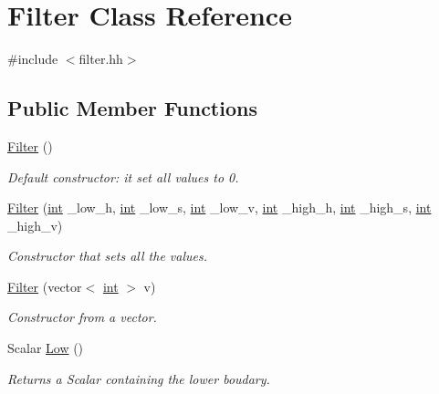 \hypertarget{class_filter}{}\section{Filter Class Reference}
\label{class_filter}


{\ttfamily \#include $<$filter.\+hh$>$}

\subsection*{Public Member Functions}
\begin{DoxyCompactItemize}
\item 
\mbox{\hyperlink{class_filter_ad15994c30d497afd567a6445446a249e}{Filter}} ()
\begin{DoxyCompactList}\small\item\em Default constructor\+: it set all values to 0. \end{DoxyCompactList}\item 
\mbox{\hyperlink{class_filter_a75b792236ffdb9590eb762e2a82802a5}{Filter}} (\mbox{\hyperlink{draw_8hh_aa620a13339ac3a1177c86edc549fda9b}{int}} \+\_\+low\+\_\+h, \mbox{\hyperlink{draw_8hh_aa620a13339ac3a1177c86edc549fda9b}{int}} \+\_\+low\+\_\+s, \mbox{\hyperlink{draw_8hh_aa620a13339ac3a1177c86edc549fda9b}{int}} \+\_\+low\+\_\+v, \mbox{\hyperlink{draw_8hh_aa620a13339ac3a1177c86edc549fda9b}{int}} \+\_\+high\+\_\+h, \mbox{\hyperlink{draw_8hh_aa620a13339ac3a1177c86edc549fda9b}{int}} \+\_\+high\+\_\+s, \mbox{\hyperlink{draw_8hh_aa620a13339ac3a1177c86edc549fda9b}{int}} \+\_\+high\+\_\+v)
\begin{DoxyCompactList}\small\item\em Constructor that sets all the values. \end{DoxyCompactList}\item 
\mbox{\hyperlink{class_filter_ae452f351813a2fdb9a32c78e11865447}{Filter}} (vector$<$ \mbox{\hyperlink{draw_8hh_aa620a13339ac3a1177c86edc549fda9b}{int}} $>$ v)
\begin{DoxyCompactList}\small\item\em Constructor from a vector. \end{DoxyCompactList}\item 
Scalar \mbox{\hyperlink{class_filter_a7b43f7cd0af1647ae9106af1ec159f63}{Low}} ()
\begin{DoxyCompactList}\small\item\em Returns a Scalar containing the lower boudary. \end{DoxyCompactList}\item 

\end{DoxyCompactItemize}
